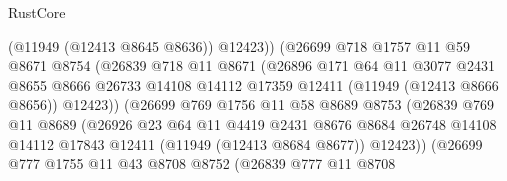 \begin{lexlean}{RustCore}
\begin{coremodule}
                                (@11949 (@12413 @8645 @8636))
                                @12423))
                            (@26699
                              @718
                              @1757
                              @11
                              @59
                              @8671
                              @8754
                              (@26839
                                @718
                                @11
                                @8671
                                (@26896
                                  @171
                                  @64
                                  @11
                                  @3077
                                  @2431
                                  @8655
                                  @8666
                                  @26733
                                  @14108
                                  @14112
                                  @17359
                                  @12411
                                  (@11949 (@12413 @8666 @8656))
                                  @12423))
                              (@26699
                                @769
                                @1756
                                @11
                                @58
                                @8689
                                @8753
                                (@26839
                                  @769
                                  @11
                                  @8689
                                  (@26926
                                    @23
                                    @64
                                    @11
                                    @4419
                                    @2431
                                    @8676
                                    @8684
                                    @26748
                                    @14108
                                    @14112
                                    @17843
                                    @12411
                                    (@11949 (@12413 @8684 @8677))
                                    @12423))
                                (@26699
                                  @777
                                  @1755
                                  @11
                                  @43
                                  @8708
                                  @8752
                                  (@26839
                                    @777
                                    @11
                                    @8708

\end{coremodule}
\end{lexlean}

